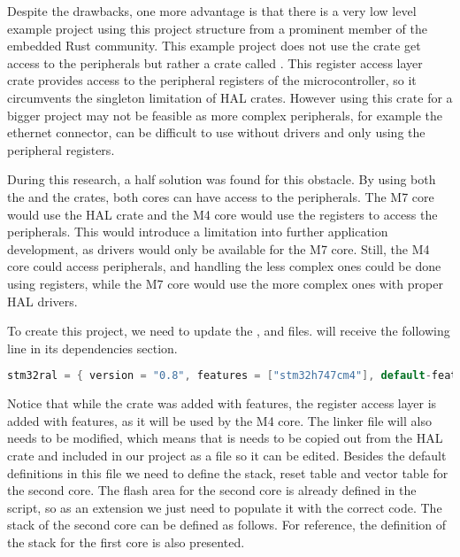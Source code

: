 Despite the drawbacks, one more advantage is that there is a very low level example project using this project structure from a prominent member of the embedded Rust community. \cite{DualCoreDemo} This example project does not use the  crate get access to the peripherals but rather a crate called . This register access layer crate provides access to the peripheral registers of the microcontroller, so it circumvents the singleton limitation of HAL crates. However using this crate for a bigger project may not be feasible as more complex peripherals, for example the ethernet connector, can be difficult to use without drivers and only using the peripheral registers.

During this research, a half solution was found for this obstacle. By using both the  and the  crates, both cores can have access to the peripherals. The M7 core would use the HAL crate and the M4 core would use the registers to access the peripherals. This would introduce a limitation into further application development, as drivers would only be available for the M7 core. Still, the M4 core could access peripherals, and handling the less complex ones could be done using registers, while the M7 core would use the more complex ones with proper HAL drivers.

To create this project, we need to update the ,  and  files.  will receive the following line in its dependencies section.

\begin{lstlisting}[language=C,frame=single,float=!ht]
    stm32ral = { version = "0.8", features = ["stm32h747cm4"], default-features = false }
\end{lstlisting}

Notice that while the  crate was added with  features, the register access layer is added with  features, as it will be used by the M4 core. The linker file will also needs to be modified, which means that is needs to be copied out from the HAL crate and included in our project as a file so it can be edited. Besides the default definitions in this file we need to define the stack, reset table and vector table for the second core. The flash area for the second core is already defined in the script, so as an extension we just need to populate it with the correct code. The stack of the second core can be defined as follows. For reference, the definition of the stack for the first core is also presented.

